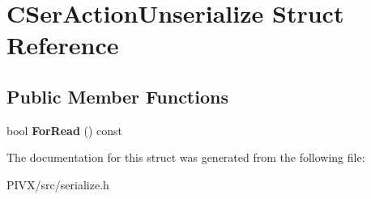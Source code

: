 \hypertarget{struct_c_ser_action_unserialize}{}\section{C\+Ser\+Action\+Unserialize Struct Reference}
\label{struct_c_ser_action_unserialize}
\subsection*{Public Member Functions}
\begin{DoxyCompactItemize}
\item 
\mbox{\label{struct_c_ser_action_unserialize_aa160459633ad25c544f43de0bbc7c4e7}} 
bool {\bfseries For\+Read} () const
\end{DoxyCompactItemize}


The documentation for this struct was generated from the following file\+:\begin{DoxyCompactItemize}
\item 
P\+I\+V\+X/src/serialize.\+h\end{DoxyCompactItemize}
